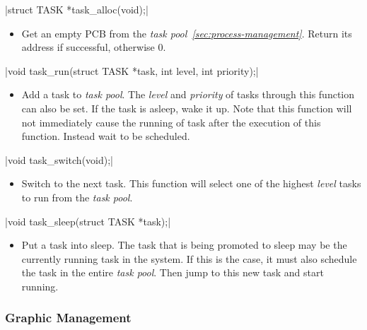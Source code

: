 \documentclass{swfcthesis}
\begin{document}
\csingle|struct TASK *task_alloc(void);|
\begin{itemize}
\item Get an empty PCB from the \emph{task pool~\ref{sec:process-management}}. Return
  its address if successful, otherwise 0. 
  
\end{itemize}

\csingle|void task_run(struct TASK *task, int level, int priority);|
\begin{itemize}
\item Add a task to \emph{task pool}. The \emph{level} and \emph{priority} of tasks
  through this function can also be set. If the task is asleep, wake it up. Note that this
  function will not immediately cause the running of task after the execution of this
  function. Instead wait to be scheduled.
\end{itemize}

\csingle|void task_switch(void);|
\begin{itemize}
\item Switch to the next task. This function will select one of the highest \emph{level}
  tasks to run from the \emph{task pool}. 
  
\end{itemize}

\csingle|void task_sleep(struct TASK *task);|
\begin{itemize}
\item Put a task into sleep. The task that is being promoted to sleep may be the currently
  running task in the system. If this is the case, it must also schedule the task in
  the entire \emph{task pool}. Then jump to this new task and start running.
      
\end{itemize}

\subsubsection{Graphic Management}
\label{sec:graphic}
\end{document}
